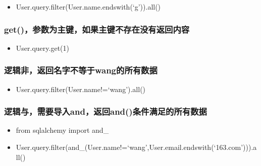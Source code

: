 \documentclass[11pt]{article}
\providecommand{\tightlist}{%
      \setlength{\itemsep}{0pt}\setlength{\parskip}{0pt}}
\begin{document}
\begin{itemize}
\tightlist
\item
  User.query.filter(User.name.endswith(`g')).all()
\end{itemize}

\hypertarget{getux53c2ux6570ux4e3aux4e3bux952eux5982ux679cux4e3bux952eux4e0dux5b58ux5728ux6ca1ux6709ux8fd4ux56deux5185ux5bb9}{%
\subsubsection{get()，参数为主键，如果主键不存在没有返回内容}\label{getux53c2ux6570ux4e3aux4e3bux952eux5982ux679cux4e3bux952eux4e0dux5b58ux5728ux6ca1ux6709ux8fd4ux56deux5185ux5bb9}}

\begin{itemize}
\tightlist
\item
  User.query.get(1)
\end{itemize}

\hypertarget{ux903bux8f91ux975eux8fd4ux56deux540dux5b57ux4e0dux7b49ux4e8ewangux7684ux6240ux6709ux6570ux636e}{%
\subsubsection{逻辑非，返回名字不等于wang的所有数据}\label{ux903bux8f91ux975eux8fd4ux56deux540dux5b57ux4e0dux7b49ux4e8ewangux7684ux6240ux6709ux6570ux636e}}

\begin{itemize}
\tightlist
\item
  User.query.filter(User.name!=`wang').all()
\end{itemize}

\hypertarget{ux903bux8f91ux4e0eux9700ux8981ux5bfcux5165andux8fd4ux56deandux6761ux4ef6ux6ee1ux8db3ux7684ux6240ux6709ux6570ux636e}{%
\subsubsection{逻辑与，需要导入and，返回and()条件满足的所有数据}\label{ux903bux8f91ux4e0eux9700ux8981ux5bfcux5165andux8fd4ux56deandux6761ux4ef6ux6ee1ux8db3ux7684ux6240ux6709ux6570ux636e}}

\begin{itemize}
\tightlist
\item
  from sqlalchemy import and\_
\item
  User.query.filter(and\_(User.name!=`wang',User.email.endswith(`163.com'))).all()
\end{itemize}
\end{document}
